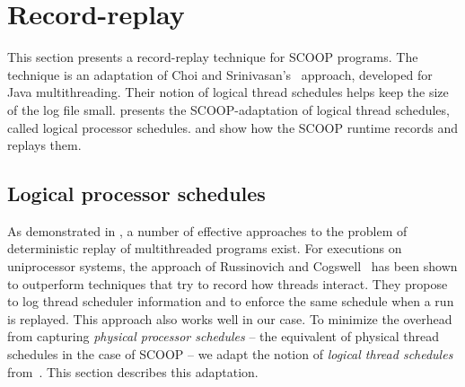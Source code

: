 \section{Record-replay}\label{sec:recordreplay}
This section presents a record-replay technique for SCOOP programs. The technique is an adaptation of Choi and
Srinivasan's~\cite{choi-srinivasan:1998:replay_for_concurrent_programs} approach, developed for
Java multithreading. Their notion
of logical thread schedules helps keep the size of the log file
small.  presents the SCOOP-adaptation of logical
thread schedules, called logical processor schedules.  and  show how the SCOOP runtime records and replays them.

\subsection{Logical processor schedules}\label{sec:logical-schedules}
As demonstrated in , a number of effective approaches to the problem of deterministic replay of multithreaded programs exist. For executions on uniprocessor systems, the approach of Russinovich and Cogswell~\cite{russinovich-cogswell:1996:replay_for_concurrent_programs} has been shown to outperform techniques that try to record how threads interact. They propose to log thread scheduler information and to enforce the same schedule when a run is replayed.
This approach also works well in our case. To minimize the overhead from capturing
\emph{physical processor schedules} -- the equivalent of physical thread schedules in the case of
SCOOP -- we adapt the notion of \emph{logical thread schedules} from~\cite{choi-srinivasan:1998:replay_for_concurrent_programs}. This section describes this adaptation.

